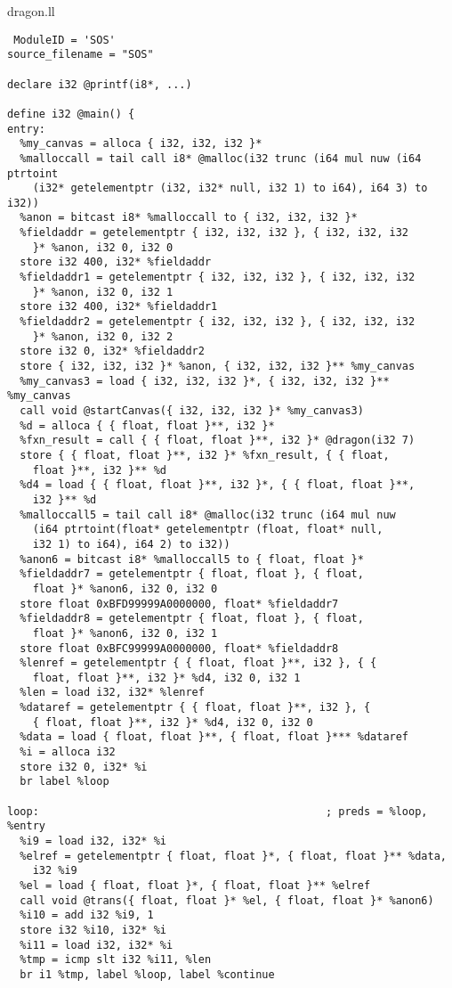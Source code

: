 \documentclass[main.tex]{subfiles}
\begin{document}
{\small
\colorbox{green!30}{dragon.ll}
\begin{lstlisting}
 ModuleID = 'SOS'
source_filename = "SOS"

declare i32 @printf(i8*, ...)

define i32 @main() {
entry:
  %my_canvas = alloca { i32, i32, i32 }*
  %malloccall = tail call i8* @malloc(i32 trunc (i64 mul nuw (i64 ptrtoint 
    (i32* getelementptr (i32, i32* null, i32 1) to i64), i64 3) to i32))
  %anon = bitcast i8* %malloccall to { i32, i32, i32 }*
  %fieldaddr = getelementptr { i32, i32, i32 }, { i32, i32, i32
    }* %anon, i32 0, i32 0
  store i32 400, i32* %fieldaddr
  %fieldaddr1 = getelementptr { i32, i32, i32 }, { i32, i32, i32
    }* %anon, i32 0, i32 1
  store i32 400, i32* %fieldaddr1
  %fieldaddr2 = getelementptr { i32, i32, i32 }, { i32, i32, i32
    }* %anon, i32 0, i32 2
  store i32 0, i32* %fieldaddr2
  store { i32, i32, i32 }* %anon, { i32, i32, i32 }** %my_canvas
  %my_canvas3 = load { i32, i32, i32 }*, { i32, i32, i32 }** %my_canvas
  call void @startCanvas({ i32, i32, i32 }* %my_canvas3)
  %d = alloca { { float, float }**, i32 }*
  %fxn_result = call { { float, float }**, i32 }* @dragon(i32 7)
  store { { float, float }**, i32 }* %fxn_result, { { float, 
    float }**, i32 }** %d
  %d4 = load { { float, float }**, i32 }*, { { float, float }**, 
    i32 }** %d
  %malloccall5 = tail call i8* @malloc(i32 trunc (i64 mul nuw 
    (i64 ptrtoint(float* getelementptr (float, float* null,
    i32 1) to i64), i64 2) to i32))
  %anon6 = bitcast i8* %malloccall5 to { float, float }*
  %fieldaddr7 = getelementptr { float, float }, { float, 
    float }* %anon6, i32 0, i32 0
  store float 0xBFD99999A0000000, float* %fieldaddr7
  %fieldaddr8 = getelementptr { float, float }, { float, 
    float }* %anon6, i32 0, i32 1
  store float 0xBFC99999A0000000, float* %fieldaddr8
  %lenref = getelementptr { { float, float }**, i32 }, { {
    float, float }**, i32 }* %d4, i32 0, i32 1
  %len = load i32, i32* %lenref
  %dataref = getelementptr { { float, float }**, i32 }, {
    { float, float }**, i32 }* %d4, i32 0, i32 0
  %data = load { float, float }**, { float, float }*** %dataref
  %i = alloca i32
  store i32 0, i32* %i
  br label %loop

loop:                                             ; preds = %loop, %entry
  %i9 = load i32, i32* %i
  %elref = getelementptr { float, float }*, { float, float }** %data,
    i32 %i9
  %el = load { float, float }*, { float, float }** %elref
  call void @trans({ float, float }* %el, { float, float }* %anon6)
  %i10 = add i32 %i9, 1
  store i32 %i10, i32* %i
  %i11 = load i32, i32* %i
  %tmp = icmp slt i32 %i11, %len
  br i1 %tmp, label %loop, label %continue


\end{lstlisting}}
\end{document}
